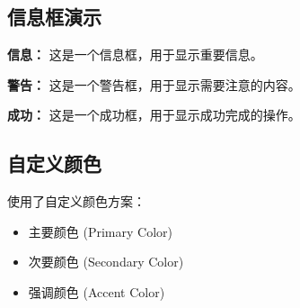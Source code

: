 \documentclass[11pt,a4paper]{article}
\begin{document}
\subsection{信息框演示}

\begin{infobox}
    \textbf{信息：} 这是一个信息框，用于显示重要信息。
\end{infobox}

\begin{warningbox}
    \textbf{警告：} 这是一个警告框，用于显示需要注意的内容。
\end{warningbox}

\begin{successbox}
    \textbf{成功：} 这是一个成功框，用于显示成功完成的操作。
\end{successbox}

\subsection{自定义颜色}

使用了自定义颜色方案：
\begin{itemize}
    \item \textcolor{primarycolor}{主要颜色 (Primary Color)}
    \item \textcolor{secondarycolor}{次要颜色 (Secondary Color)}
    \item \textcolor{accentcolor}{强调颜色 (Accent Color)}
\end{itemize}
\end{document}
